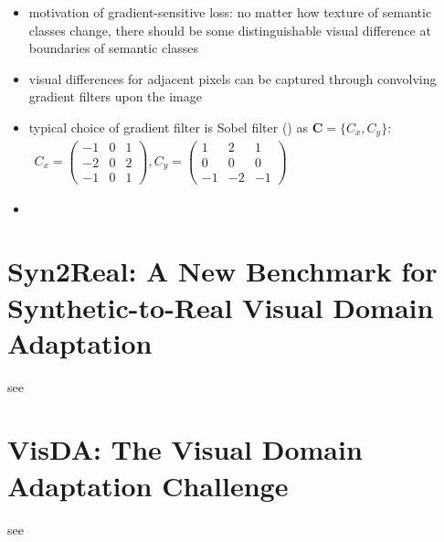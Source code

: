 \begin{itemize}
	\item motivation of gradient-sensitive loss: no matter how texture of semantic classes change, there should be some distinguishable visual difference at boundaries of semantic classes
	\item visual differences for adjacent pixels can be captured through convolving gradient filters upon the image
	\item typical choice of gradient filter is Sobel filter () as $\mathbf{C} = \{C_x, C_y\}$:
	$\begin{array}{cc}
		C_x = 
		\begin{pmatrix}
			-1 & 0 & 1\\
			-2 & 0 & 2\\
			-1 & 0 & 1
		\end{pmatrix},
		C_y = 
		\begin{pmatrix}
			1 & 2 & 1\\
			0 & 0 & 0\\
			-1 & -2 & -1
		\end{pmatrix}
	\end{array}$
	\item 
\end{itemize}

\section{Syn2Real: A New Benchmark for Synthetic-to-Real Visual Domain Adaptation}

see \cite{DBLP:journals/corr/abs-1806-09755}


\section{VisDA: The Visual Domain Adaptation Challenge}

see \cite{DBLP:journals/corr/abs-1710-06924}